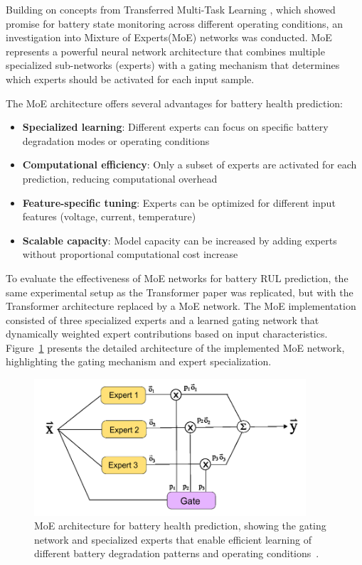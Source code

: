 Building on concepts from Transferred Multi-Task Learning \cite{che_battery_2023}, which showed promise for battery state monitoring across different operating conditions, an investigation into Mixture of Experts(MoE) networks was conducted. MoE represents a powerful neural network architecture that combines multiple specialized sub-networks (experts) with a gating mechanism that determines which experts should be activated for each input sample.

The MoE architecture offers several advantages for battery health prediction:

\begin{itemize}
    \item \textbf{Specialized learning}: Different experts can focus on specific battery degradation modes or operating conditions
    \item \textbf{Computational efficiency}: Only a subset of experts are activated for each prediction, reducing computational overhead
    \item \textbf{Feature-specific tuning}: Experts can be optimized for different input features (voltage, current, temperature)
    \item \textbf{Scalable capacity}: Model capacity can be increased by adding experts without proportional computational cost increase
\end{itemize}

To evaluate the effectiveness of MoE networks for battery RUL prediction, the same experimental setup as the Transformer paper was replicated, but with the Transformer architecture replaced by a MoE network. The MoE implementation consisted of three specialized experts and a learned gating network that dynamically weighted expert contributions based on input characteristics. Figure~\ref{fig:moe_architecture} presents the detailed architecture of the implemented MoE network, highlighting the gating mechanism and expert specialization.

\begin{figure}[htbp]
\centering
\includegraphics[width=0.9\textwidth]{imgs/Moe_arq.png}
\caption{MoE architecture for battery health prediction, showing the gating network and specialized experts that enable efficient learning of different battery degradation patterns and operating conditions~\cite{moe_arq}.}
\label{fig:moe_architecture}
\end{figure}


